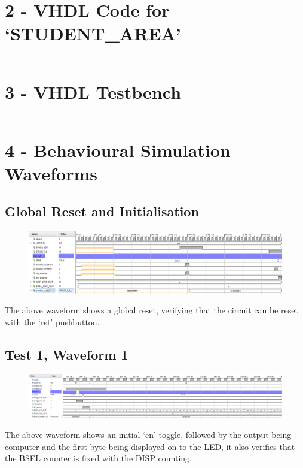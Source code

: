 \documentclass[11pt]{report}
\begin{document}
\section*{2 - VHDL Code for `STUDENT\_AREA'}
\inputminted{vhdl}{../../../DE_Project_T1/DE_Project_T1.srcs/sources_1/imports/DigEng_Proj_T1_model/STUDENT_AREA.vhd}

\newpage

\section*{3 - VHDL Testbench}
\inputminted{vhdl}{../../../DE_Project_T1/DE_Project_T1.srcs/sim_1/imports/DigEng_Proj_T1_model/TOP_LEVEL_tb.vhd}

\newpage

\section*{4 - Behavioural Simulation Waveforms}

\subsection*{Global Reset and Initialisation}
\begin{figure}[H]
    \includegraphics[width=\columnwidth]{Assets/reset.png}
\end{figure}
The above waveform shows a global reset, verifying that the circuit can be reset with the `rst' pushbutton.

\subsection*{Test 1, Waveform 1}
\begin{figure}[H]
    \includegraphics[width=\columnwidth]{Assets/test1_1.png}
\end{figure}
The above waveform shows an initial `en' toggle, followed by the output being computer and the first byte
being displayed on to the LED, it also verifies that the BSEL counter is fixed with the DISP counting.
\end{document}
